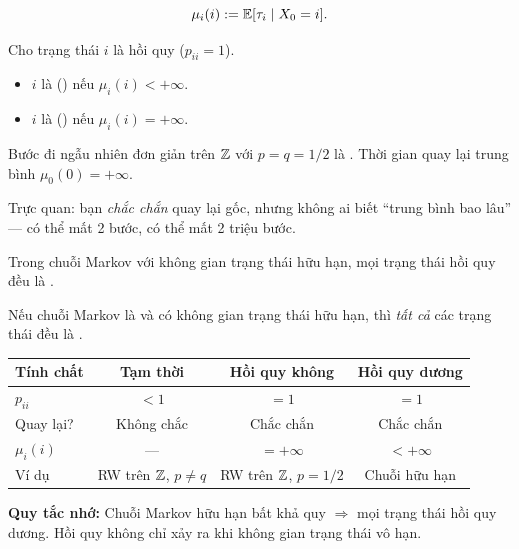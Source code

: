 \begin{dinhnghia}
\[
  \mu_i(i) := \mathbb{E}[\tau_i \mid X_0 = i].
\]
\end{dinhnghia}

\begin{dinhnghia}
Cho trạng thái $i$ là hồi quy ($p_{ii} = 1$).
\begin{itemize}[nosep]
  \item $i$ là  () nếu $\mu_i(i) < +\infty$.
  \item $i$ là  () nếu $\mu_i(i) = +\infty$.
\end{itemize}
\end{dinhnghia}

\begin{example}
Bước đi ngẫu nhiên đơn giản trên $\mathbb{Z}$ với $p = q = 1/2$ là .
Thời gian quay lại trung bình $\mu_0(0) = +\infty$.

Trực quan: bạn \emph{chắc chắn} quay lại gốc, nhưng không ai biết ``trung bình bao lâu'' ---
có thể mất 2 bước, có thể mất 2 triệu bước.
\end{example}

\begin{dinhly}
\label{thm:finite-positive-recurrent}
Trong chuỗi Markov với không gian trạng thái hữu hạn, mọi trạng thái hồi quy đều là
.
\end{dinhly}

\begin{corollary}
\label{cor:finite-irreducible}
Nếu chuỗi Markov là  và có không gian trạng thái hữu hạn,
thì \emph{tất cả} các trạng thái đều là .
\end{corollary}

\begin{tomtat}
\begin{center}
\renewcommand{\arraystretch}{1.4}
\begin{tabular}{lccc}
\hline
\textbf{Tính chất} & \textbf{Tạm thời} & \textbf{Hồi quy không} & \textbf{Hồi quy dương} \\
\hline
$p_{ii}$ & $< 1$ & $= 1$ & $= 1$ \\
Quay lại? & Không chắc & Chắc chắn & Chắc chắn \\
$\mu_i(i)$ & --- & $= +\infty$ & $< +\infty$ \\
Ví dụ & RW trên $\mathbb{Z}$, $p \neq q$ & RW trên $\mathbb{Z}$, $p = 1/2$ & Chuỗi hữu hạn \\
\hline
\end{tabular}
\end{center}

\textbf{Quy tắc nhớ:} Chuỗi Markov hữu hạn bất khả quy $\Rightarrow$ mọi trạng thái hồi quy dương.
Hồi quy không chỉ xảy ra khi không gian trạng thái vô hạn.
\end{tomtat}

